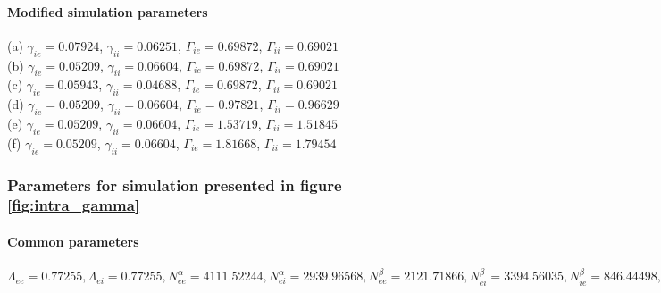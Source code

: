 \documentclass[a4paper,12pt]{article}
\begin{document}
\paragraph{Modified simulation parameters}
(a) $\gamma_{ie} = 0.07924$, $\gamma_{ii} = 0.06251$, $\Gamma_{ie} = 0.69872$, $\Gamma_{ii} = 0.69021$\\
(b) $\gamma_{ie} = 0.05209$, $\gamma_{ii} = 0.06604$, $\Gamma_{ie} = 0.69872$, $\Gamma_{ii} = 0.69021$\\
(c) $\gamma_{ie} = 0.05943$, $\gamma_{ii} = 0.04688$, $\Gamma_{ie} = 0.69872$, $\Gamma_{ii} = 0.69021$\\
(d) $\gamma_{ie} = 0.05209$, $\gamma_{ii} = 0.06604$, $\Gamma_{ie} = 0.97821$, $\Gamma_{ii} = 0.96629$\\
(e) $\gamma_{ie} = 0.05209$, $\gamma_{ii} = 0.06604$, $\Gamma_{ie} = 1.53719$, $\Gamma_{ii} = 1.51845$\\
(f) $\gamma_{ie} = 0.05209$, $\gamma_{ii} = 0.06604$, $\Gamma_{ie} = 1.81668$, $\Gamma_{ii} = 1.79454$\\


\subsubsection{Parameters for simulation presented in figure \ref{fig:intra_gamma}}
\paragraph{Common parameters}
$\Lambda_{ee} = 0.77255, \Lambda_{ei} = 0.77255, N^{\alpha}_{ee} = 4111.52244, N^{\alpha}_{ei} = 2939.96568,
N^{\beta}_{ee} = 2121.71866, N^{\beta}_{ei} = 3394.56035, N^{\beta}_{ie} =  846.44498, N^{\beta}_{ii} = 178.04925,
\hat{\Gamma}_{ee} =  0.10367, \hat{\Gamma}_{ei} = 1.21771, 
\chi_{ee} = 420.196, \chi_{ei} = 420.196, \gamma_{ee} = 0.07383,
\gamma_{ei} = 0.82956, h_e^{rest} = -68.11516,
h_{ee}^{eq} = -6.87622, h_{ei}^{eq} = -10.85385, h_i^{rest} = -79.2805, h_{ie}^{eq} = -78.14073,
h_{ii}^{eq} = -89.33821, \mu_e = -45.58067, \mu_i = -46.22321,
p_{ee} = 3.12714, p_{ei} = 5.15692,
p_{ie} = 0.0, p_{ii}: 0.0, \phi_{ie} = 0, \phi_{ii} = 0, S_e^{max} = 0.11240, S_i^{max} = 0.17063,
\sigma_e = 3.61819399, \sigma_i = 3.12887627, \tau_e = 21.0098, \tau_i = 77.73, 
\tau^{slow}_{ee} = 420.196, \tau^{slow}_{ei} = 420.196, v_{ee} = 0.96791, v_{ei} = 0.96791$
\end{document}
